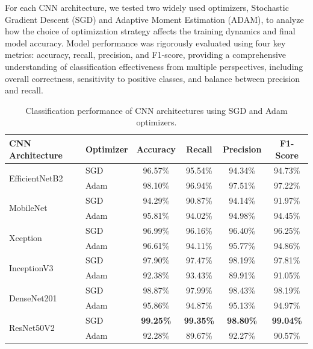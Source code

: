 For each CNN architecture, we tested two widely used optimizers, Stochastic Gradient Descent (SGD) and Adaptive Moment Estimation (ADAM), to analyze how the choice of optimization strategy affects the training dynamics and final model accuracy. Model performance was rigorously evaluated using four key metrics: accuracy, recall, precision, and F1-score, providing a comprehensive understanding of classification effectiveness from multiple perspectives, including overall correctness, sensitivity to positive classes, and balance between precision and recall.

\begin{table}[h]
    \centering
    \renewcommand{\arraystretch}{1.4}
    \setlength{\tabcolsep}{10pt}
    \caption{Classification performance of CNN architectures using SGD and Adam optimizers.}
    \label{tab:cnn_performance}
    \begin{tabular}{|p{4cm}|p{2cm}|c|c|c|c|}
        \hline
        \textbf{CNN Architecture} & \textbf{Optimizer} & \textbf{Accuracy} & \textbf{Recall} & \textbf{Precision} & \textbf{F1-Score} \\ \hline

        \multirow{2}{*}{EfficientNetB2} 
        & SGD  & 96.57\% & 95.54\% & 94.34\% & 94.73\% \\ \cline{2-6}
        & Adam & 98.10\% & 96.94\% & 97.51\% & 97.22\% \\ \hline

        \multirow{2}{*}{MobileNet} 
        & SGD  & 94.29\% & 90.87\% & 94.14\% & 91.97\% \\ \cline{2-6}
        & Adam & 95.81\% & 94.02\% & 94.98\% & 94.45\% \\ \hline

        \multirow{2}{*}{Xception} 
        & SGD  & 96.99\% & 96.16\% & 96.40\% & 96.25\% \\ \cline{2-6}
        & Adam & 96.61\% & 94.11\% & 95.77\% & 94.86\% \\ \hline

        \multirow{2}{*}{InceptionV3} 
        & SGD  & 97.90\% & 97.47\% & 98.19\% & 97.81\% \\ \cline{2-6}
        & Adam & 92.38\% & 93.43\% & 89.91\% & 91.05\% \\ \hline

        \multirow{2}{*}{DenseNet201} 
        & SGD  & 98.87\% & 97.99\% & 98.43\% & 98.19\% \\ \cline{2-6}
        & Adam & 95.86\% & 94.87\% & 95.13\% & 94.97\% \\ \hline

        \multirow{2}{*}{ResNet50V2} 
        & SGD  & \textbf{99.25\%} & \textbf{99.35\%} & \textbf{98.80\%} & \textbf{99.04\%} \\ \cline{2-6}
        & Adam & 92.28\% & 89.67\% & 92.27\% & 90.57\% \\ \hline
    \end{tabular}
\end{table}

